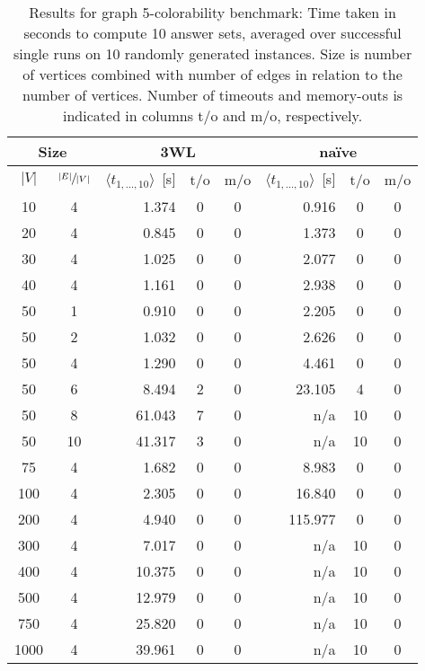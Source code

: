 \documentclass{vutinfth} %
\begin{document}
\begin{table}
\begin{center}
	\begin{tabular}{|cc||rcc|rcc|}
\hline
\multicolumn{2}{|c||}{Size} & \multicolumn{3}{c|}{3WL} & \multicolumn{3}{c|}{na\"{i}ve} \\
\hline
$|V|$ & $\sfrac{|E|}{|V|}$& $\langle t_{1, \ldots, 10} \rangle$~[s]&t/o&m/o& $\langle t_{1, \ldots, 10} \rangle$~[s]&t/o&m/o\\
\hline
\hline
  10 &   4 & 	  1.374 & 0 & 0 &	  0.916 &  0 & 0 \\
  20 &   4 & 	  0.845 & 0 & 0 &	  1.373 &  0 & 0 \\
  30 &   4 & 	  1.025 & 0 & 0 &	  2.077 &  0 & 0 \\
  40 &   4 & 	  1.161 & 0 & 0 &	  2.938 &  0 & 0 \\
  50 &   1 & 	  0.910 & 0 & 0 &	  2.205 &  0 & 0 \\
  50 &   2 & 	  1.032 & 0 & 0 &	  2.626 &  0 & 0 \\
  50 &   4 & 	  1.290 & 0 & 0 &	  4.461 &  0 & 0 \\
  50 &   6 & 	  8.494 & 2 & 0 &	 23.105 &  4 & 0 \\
  50 &   8 & 	 61.043 & 7 & 0 &	    n/a & 10 & 0 \\
  50 &  10 & 	 41.317 & 3 & 0 &	    n/a & 10 & 0 \\
  75 &   4 & 	  1.682 & 0 & 0 &	  8.983 &  0 & 0 \\
 100 &   4 & 	  2.305 & 0 & 0 &	 16.840 &  0 & 0 \\
 200 &   4 & 	  4.940 & 0 & 0 &	115.977 &  0 & 0 \\
 300 &   4 & 	  7.017 & 0 & 0 &	    n/a & 10 & 0 \\
 400 &   4 & 	 10.375 & 0 & 0 &	    n/a & 10 & 0 \\
 500 &   4 & 	 12.979 & 0 & 0 &	    n/a & 10 & 0 \\
 750 &   4 & 	 25.820 & 0 & 0 &	    n/a & 10 & 0 \\
1000 &   4 & 	 39.961 & 0 & 0 &	    n/a & 10 & 0 \\
\hline
	\end{tabular}
	\end{center}
	\caption[Results for graph 5-colorability benchmark]{Results for graph 5-colorability benchmark: Time taken in seconds to compute 10 answer sets, averaged over successful single runs on 10 randomly generated instances. Size is number of vertices combined with number of edges in relation to the number of vertices. Number of timeouts and memory-outs is indicated in columns t/o and m/o, respectively.}
	\label{tbl:5col}
\end{table}
\end{document}
